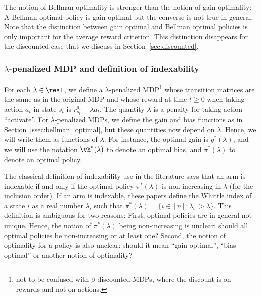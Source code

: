 The notion of Bellman optimality is stronger than the notion of gain optimality: A Bellman optimal policy is gain optimal but the converse is not true in general. Note that the distinction between gain optimal and Bellman optimal policies is only important for the average reward criterion. This distinction disappears for the discounted case that we discuss in Section~\ref{sec:discounted}.

\subsubsection{\texorpdfstring{$\lambda$-p}{P}enalized MDP and definition of indexability}
\label{sssec:penal_mdp}

For each $\lambda\in\real$, we define a $\lambda$-penalized MDP\footnote{not to be confused with $\beta$-discounted MDPs, where the discount is on rewards  and not on actions.} whose transition matrices are the same as in the original MDP and whose reward at time $t\ge0$ when taking action $a_t$ in state $s_t$ is $r^{a_t}_{s_t} - \lambda a_t$. The quantity $\lambda$ is a penalty for taking action ``activate''. For $\lambda$-penalized MDPs, we define the gain and bias functions as in Section~\ref{ssec:bellman_optimal}, but these quantities now depend on $\lambda$. Hence, we will write them as functions of $\lambda$: For instance, the optimal gain is $g^*(\lambda)$, and we will use the notation $\vh^*(\lambda)$ to denote an optimal bias, and $\pi^*(\lambda)$ to denote an optimal policy.

The classical definition of indexability use in the literature \cite{akbarzadeh2020conditions,nino2020fast,gibson2021novel,nakhleh2021neurwin} says that an arm is indexable if and only if the optimal policy $\pi^*(\lambda)$ is non-increasing in $\lambda$ (for the inclusion order). If an arm is indexable, these papers define the Whittle index of a state $i$ as a real number $\lambda_i$ such that ${\pi^*(\lambda)=\{i\in[n]: \lambda_i\ > \lambda\}}$.  This definition is ambiguous for two reasons: First, optimal policies are in general not unique. Hence, the notion of $\pi^*(\lambda)$ being non-increasing is unclear: should all optimal policies be non-increasing or at least one? Second, the notion of optimality for a policy  is also unclear: should it mean ``gain optimal'', ``bias optimal'' or another notion of optimality? 

